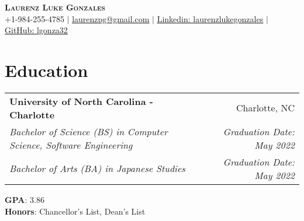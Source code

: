 \documentclass[letterpaper,11pt]{article}
\makeatletter
\newcommand{\resumeEdu}[6]{
  \vspace{-2pt}\item
    \begin{tabular*}{0.97\textwidth}[t]{l@{\extracolsep{\fill}}r}
      \textbf{#1} & #2 \\
      \textit{\small#3} & \textit{\small #4} \\
      \textit{\small#5} & \textit{\small #6} \\
    \end{tabular*}\vspace{-7pt}
}
\newcommand{\resumeSubHeadingListStart}{\begin{itemize}[leftmargin=0.15in, label={}]}
\newcommand{\resumeSubHeadingListEnd}{\end{itemize}}
\makeatother
\begin{document}

\begin{center}
    \textbf{\Huge \scshape Laurenz Luke Gonzales} \\ \vspace{1pt}
    \small +1-984-255-4785 $|$ \href{mailto:laurenzpg@gmail.com}{\underline{laurenzpg@gmail.com}} $|$ 
    \href{https://linkedin.com/in/laurenzlukegonzales}{\underline{Linkedin: laurenzlukegonzales}} $|$
    \href{https://github.com/lgonza32}{\underline{GitHub: lgonza32}}
\end{center}


\section{Education}
  \resumeSubHeadingListStart
    \resumeEdu
      {University of North Carolina - Charlotte}{Charlotte, NC}
      {Bachelor of Science (BS) in Computer Science, Software Engineering}{Graduation Date: May 2022}
      {Bachelor of Arts (BA) in Japanese Studies}{Graduation Date: May 2022}
    \small{\item{
      \textbf{GPA}{: 3.86} \\
      \textbf{Honors}{: Chancellor's List, Dean's List} \\
      }}
  \resumeSubHeadingListEnd

\end{document}
